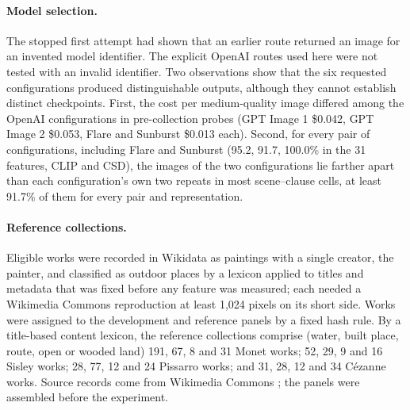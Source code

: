 \paragraph{Model selection.} The stopped first attempt had shown that an earlier route returned an
image for an invented model identifier. The explicit OpenAI routes used here were not tested with
an invalid identifier. Two observations show that the six requested configurations produced
distinguishable outputs, although they cannot establish distinct checkpoints. First, the cost per medium-quality image differed among the OpenAI
configurations in pre-collection probes (GPT Image 1 \$0.042, GPT Image 2 \$0.053, Flare and
Sunburst \$0.013 each). Second, for every pair of configurations, including Flare and Sunburst (95.2,
91.7, 100.0\% in the 31 features, CLIP and CSD), the images of the two configurations lie farther
apart than each configuration's own two repeats in most scene--clause cells, at least 91.7\% of them
for every pair and representation.

\paragraph{Reference collections.}
Eligible works were recorded in Wikidata as paintings with a single creator, the painter, and
classified as outdoor places by a lexicon applied to titles and metadata that was fixed before
any feature was measured; each needed a Wikimedia Commons reproduction at least 1,024 pixels on
its short side. Works were assigned to the development and reference panels by a fixed hash
rule. By a title-based content lexicon, the reference collections comprise (water, built place,
route, open or wooded land) 191, 67, 8 and 31 Monet works; 52, 29, 9 and 16 Sisley works; 28,
77, 12 and 24 Pissarro works; and 31, 28, 12 and 34 C\'ezanne works. Source records come from Wikimedia
Commons \citep{wikimediacommons}; the panels were assembled before the experiment.

